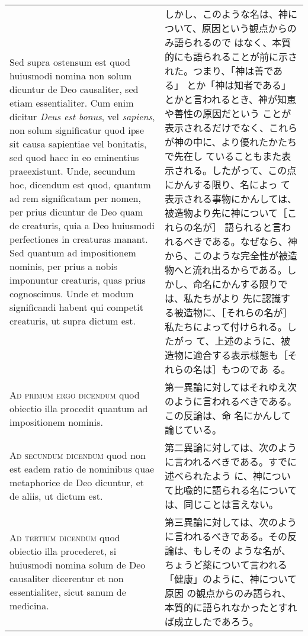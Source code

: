 \documentclass[10pt]{jsarticle}
\begin{document}
\begin{longtable}{p{21em}p{21em}}
\\

Sed supra ostensum est quod huiusmodi nomina non solum dicuntur de Deo
causaliter, sed etiam essentialiter. Cum enim dicitur {\itshape Deus
est bonus}, vel {\itshape sapiens}, non solum significatur quod ipse
sit causa sapientiae vel bonitatis, sed quod haec in eo eminentius
praeexistunt. Unde, secundum hoc, dicendum est quod, quantum ad rem
significatam per nomen, per prius dicuntur de Deo quam de creaturis,
quia a Deo huiusmodi perfectiones in creaturas manant. Sed quantum ad
impositionem nominis, per prius a nobis imponuntur creaturis, quas
prius cognoscimus. Unde et modum significandi habent qui competit
creaturis, ut supra dictum est.

&

しかし、このような名は、神について、原因という観点からのみ語られるので
はなく、本質的にも語られることが前に示された。つまり、「神は善である」
とか「神は知者である」とかと言われるとき、神が知恵や善性の原因だという
ことが表示されるだけでなく、これらが神の中に、より優れたかたちで先在し
ていることもまた表示される。したがって、この点にかんする限り、名によっ
て表示される事物にかんしては、被造物より先に神について［これらの名が］
語られると言われるべきである。なぜなら、神から、このような完全性が被造
物へと流れ出るからである。しかし、命名にかんする限りでは、私たちがより
先に認識する被造物に、［それらの名が］私たちによって付けられる。したがっ
て、上述のように、被造物に適合する表示様態も［それらの名は］もつのであ
る。

\\

{\scshape Ad primum ergo dicendum} quod obiectio illa procedit quantum
ad impositionem nominis.

&

第一異論に対してはそれゆえ次のように言われるべきである。この反論は、命
名にかんして論じている。

\\

{\scshape Ad secundum dicendum} quod non est eadem ratio de nominibus
quae metaphorice de Deo dicuntur, et de aliis, ut dictum est.

&

第二異論に対しては、次のように言われるべきである。すでに述べられたよう
に、神について比喩的に語られる名については、同じことは言えない。

\\

{\scshape Ad tertium dicendum} quod obiectio illa procederet, si
huiusmodi nomina solum de Deo causaliter dicerentur et non
essentialiter, sicut sanum de medicina.

&

第三異論に対しては、次のように言われるべきである。その反論は、もしその
ような名が、ちょうど薬について言われる「健康」のように、神について原因
の観点からのみ語られ、本質的に語られなかったとすれば成立したであろう。

\end{longtable}
\newpage
{}
\end{document}
